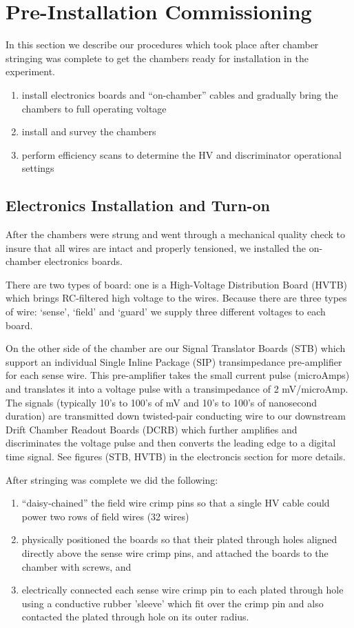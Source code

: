 \section{Pre-Installation Commissioning}

In this section we describe our procedures which took
place after chamber stringing was complete to get the
chambers ready for installation in the experiment.

\begin{enumerate}
\item install electronics boards and ``on-chamber'' cables
and gradually bring the chambers to full operating voltage 
\item install and survey the chambers
\item perform efficiency scans to determine the HV and discriminator operational settings
\end{enumerate}

\subsection{Electronics Installation and Turn-on}
After the chambers were strung and went through a mechanical quality
check to insure that all wires are intact and properly tensioned, we
installed the on-chamber electronics boards.

There are two types of board: one is a High-Voltage Distribution Board (HVTB)
which brings RC-filtered high voltage to the wires.  Because there are three
types of wire: `sense', `field' and `guard' we supply three different voltages
to each board.  

On the other side of the chamber are our Signal Translator Boards (STB) 
which support an individual Single Inline Package (SIP) transimpedance
pre-amplifier for each sense wire.  This pre-amplifier takes the
small current pulse (microAmps) and translates it into a voltage 
pulse with a transimpedance of 2 mV/microAmp.  The signals (typically
10's to 100's of mV and 10's to 100's of nanosecond duration) are
transmitted down twisted-pair conducting wire to our downstream
Drift Chamber Readout Boards (DCRB) which further amplifies and
discriminates the voltage pulse and then converts the leading edge
to a digital time signal.
See figures (STB, HVTB) in the electroncis section for more details.

After stringing was complete we did the following:
\begin{enumerate}
\item ``daisy-chained'' the field wire crimp pins so that a single
HV cable could power two rows of field wires (32 wires)
\item physically positioned the boards so that their plated through
holes aligned directly above the sense wire crimp pins, and attached
the boards to the chamber with screws, and
\item electrically connected each sense wire crimp pin to each
plated through hole using a conductive rubber 'sleeve' which fit
over the crimp pin and also contacted the plated through hole on
its outer radius.
\end{enumerate}

